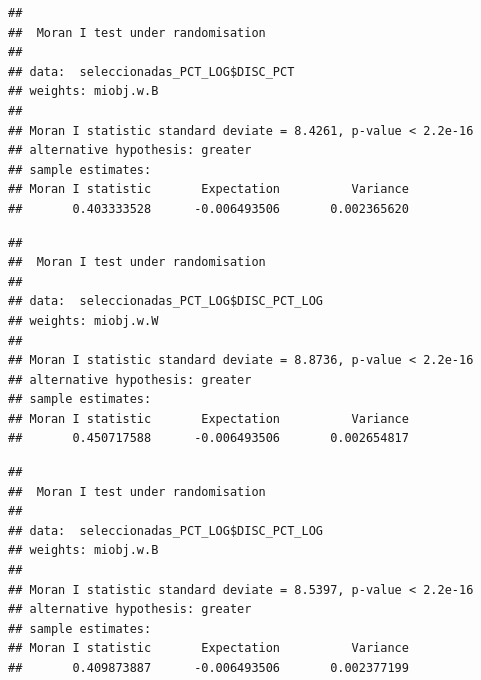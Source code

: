 \documentclass[11pt,]{article}
\newenvironment{Shaded}{\begin{snugshade}}{\end{snugshade}}
\newcommand{\KeywordTok}[1]{\textcolor[rgb]{0.13,0.29,0.53}{\textbf{#1}}}
\newcommand{\DataTypeTok}[1]{\textcolor[rgb]{0.13,0.29,0.53}{#1}}
\newcommand{\StringTok}[1]{\textcolor[rgb]{0.31,0.60,0.02}{#1}}
\newcommand{\OperatorTok}[1]{\textcolor[rgb]{0.81,0.36,0.00}{\textbf{#1}}}
\newcommand{\NormalTok}[1]{#1}
\begin{document}
\begin{Shaded}
\end{Shaded}

\begin{verbatim}
## 
##  Moran I test under randomisation
## 
## data:  seleccionadas_PCT_LOG$DISC_PCT  
## weights: miobj.w.B    
## 
## Moran I statistic standard deviate = 8.4261, p-value < 2.2e-16
## alternative hypothesis: greater
## sample estimates:
## Moran I statistic       Expectation          Variance 
##       0.403333528      -0.006493506       0.002365620
\end{verbatim}

\begin{Shaded}
\end{Shaded}

\begin{verbatim}
## 
##  Moran I test under randomisation
## 
## data:  seleccionadas_PCT_LOG$DISC_PCT_LOG  
## weights: miobj.w.W    
## 
## Moran I statistic standard deviate = 8.8736, p-value < 2.2e-16
## alternative hypothesis: greater
## sample estimates:
## Moran I statistic       Expectation          Variance 
##       0.450717588      -0.006493506       0.002654817
\end{verbatim}

\begin{Shaded}
\end{Shaded}

\begin{verbatim}
## 
##  Moran I test under randomisation
## 
## data:  seleccionadas_PCT_LOG$DISC_PCT_LOG  
## weights: miobj.w.B    
## 
## Moran I statistic standard deviate = 8.5397, p-value < 2.2e-16
## alternative hypothesis: greater
## sample estimates:
## Moran I statistic       Expectation          Variance 
##       0.409873887      -0.006493506       0.002377199
\end{verbatim}
\end{document}
